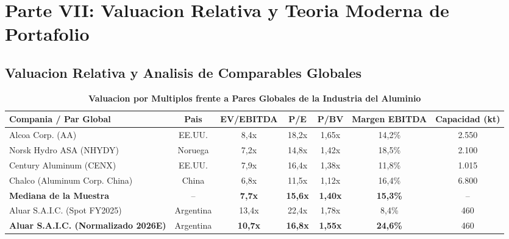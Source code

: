 \documentclass[10pt,a4paper]{article}
\theoremstyle{definition}
\begin{document}
\section{Parte VII: Valuacion Relativa y Teoria Moderna de Portafolio}

\subsection{Valuacion Relativa y Analisis de Comparables Globales}
\begin{table}[H]
\centering
\caption{\textbf{Valuacion por Multiplos frente a Pares Globales de la Industria del Aluminio}}
\small
\begin{tabular}{lcccccc}
\toprule
\textbf{Compania / Par Global} & \textbf{Pais} & \textbf{EV/EBITDA} & \textbf{P/E} & \textbf{P/BV} & \textbf{Margen EBITDA} & \textbf{Capacidad (kt)} \\
\midrule
Alcoa Corp. (AA) & EE.UU. & 8,4x & 18,2x & 1,65x & 14,2\% & 2.550 \\
Norsk Hydro ASA (NHYDY) & Noruega & 7,2x & 14,8x & 1,42x & 18,5\% & 2.100 \\
Century Aluminum (CENX) & EE.UU. & 7,9x & 16,4x & 1,38x & 11,8\% & 1.015 \\
Chalco (Aluminum Corp. China) & China & 6,8x & 11,5x & 1,12x & 16,4\% & 6.800 \\
\midrule
\textbf{Mediana de la Muestra} & -- & \textbf{7,7x} & \textbf{15,6x} & \textbf{1,40x} & \textbf{15,3\%} & -- \\
Aluar S.A.I.C. (Spot FY2025) & Argentina & 13,4x & 22,4x & 1,78x & 8,4\% & 460 \\
\textbf{Aluar S.A.I.C. (Normalizado 2026E)} & Argentina & \textbf{10,7x} & \textbf{16,8x} & \textbf{1,55x} & \textbf{24,6\%} & 460 \\
\bottomrule
\end{tabular}
\end{table}
\end{document}
